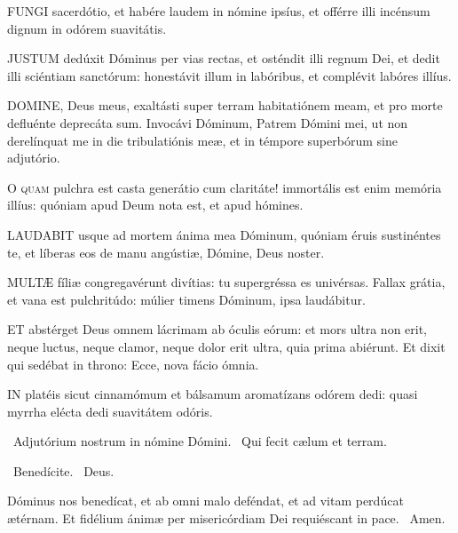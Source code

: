 
\lettrine[lines=2]{F}{UNGI} sacerdótio, et habére laudem in nómine ipsíus, et offérre illi incénsum dignum in odórem suavitátis.


\lettrine[lines=2]{J}{USTUM} dedúxit Dóminus per vias rectas, et osténdit illi regnum Dei, et dedit illi sciéntiam sanctórum: honestávit illum in labóribus, et complévit labóres illíus.


\lettrine[lines=2]{D}{OMINE}, Deus meus, exaltásti super terram habitatiónem meam, et pro morte defluénte deprecáta sum. Invocávi Dóminum, Patrem Dómini mei, ut non derelínquat me in die tribulatiónis meæ, et in témpore superbórum sine adjutório.


\lettrine[lines=2]{O}{} \textsc{quam} pulchra est casta generátio cum claritáte! immortális est enim memória illíus: quóniam apud Deum nota est, et apud hómines.


\lettrine[lines=2]{L}{AUDABIT} usque ad mortem ánima mea Dóminum, quóniam éruis sustinéntes te, et líberas eos de manu angústiæ, Dómine, Deus noster.


\lettrine[lines=2]{M}{ULTÆ} fíliæ congregavérunt divítias: tu supergréssa es univérsas. Fallax grátia, et vana est pulchritúdo: múlier timens Dóminum, ipsa laudábitur.


\lettrine[lines=2]{E}{T} abstérget Deus omnem lácrimam ab óculis eórum: et mors ultra non erit, neque luctus, neque clamor, neque dolor erit ultra, quia prima abiérunt. Et dixit qui sedébat in throno: Ecce, nova fácio ómnia.


\lettrine[lines=2]{I}{N} platéis sicut cinnamómum et bálsamum aromatízans odórem dedi: quasi myrrha elécta dedi suavitátem odóris.

\sectionornament

\V\ Adjutórium nostrum in nómine Dómini. \R\ Qui fecit cælum et terram.

\V\ Benedícite. \R\ Deus.

 Dóminus nos benedícat, et ab omni malo deféndat, et ad vitam perdúcat ætérnam. Et fidélium ánimæ per misericórdiam Dei requiéscant in pace. \R\ Amen.


